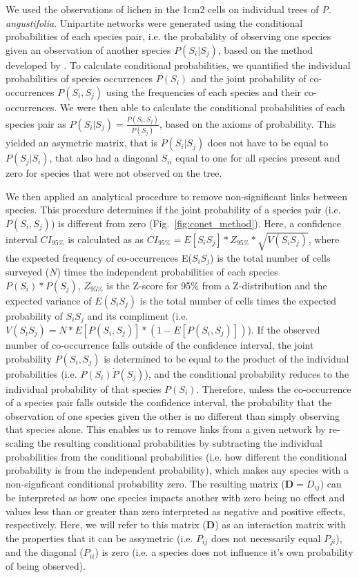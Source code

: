 \documentclass[9pt,twocolumn,twoside,lineno]{pnas-new}
\begin{document}
{We used the observations of lichen in the 1cm2 cells on individual
trees of \textit{P. angustifolia}. Unipartite networks were generated
using the conditional probabilities of each species pair, i.e. the
probability of observing one species given an observation of another
species $P(S_i | S_j)$, based on the method developed by
\citep{Araujo2011}. To calculate conditional probabilities, we
quantified the individual probabilities of species occurrences
$P(S_i)$ and the joint probability of co-occurrences $P(S_i,S_j)$
using the frequencies of each species and their co-occurrences. We
were then able to calculate the conditional probabilities of each
species pair as $P(S_i|S_j) = \frac{P(S_i,S_j)}{P(S_j)}$, based on the
axioms of probability. This yielded an asymetric matrix, that is
$P(S_i|S_j)$ does not have to be equal to $P(S_j|S_i)$, that also had
a diagonal $S_{ii}$ equal to one for all species present and zero for
species that were not observed on the tree.

We then applied an analytical procedure to remove non-significant
links between species. This procedure determines if the joint
probability of a species pair (i.e. $P(S_i,S_j)$) is different from
zero (Fig.~\ref{fig:conet_method}).  Here, a confidence interval
$CI_{95\%}$ is calculated as as $CI_{95\%} = E[S_iS_j] * Z_{95\%} *
\sqrt{V(S_iS_j)}$, where the expected frequency of co-occurrences
E($S_iS_j$) is the total number of cells surveyed ($N$) times the
independent probabilities of each species $P(S_i) * P(S_j)$,
$Z_{95\%}$ is the Z-score for 95\% from a Z-distribution and the
expected variance of $E(S_iS_j)$ is the total number of cells times
the expected probability of $S_iS_j$ and its compliment
(i.e. $V(S_iS_j) = N * E[P(S_i,S_j)] * (1 - E[P(S_i,S_j)])$). If the
observed number of co-occurrence falls outside of the confidence
interval, the joint probability $P(S_i,S_j)$ is determined to be equal
to the product of the individual probabilities (i.e. $P(S_i) \dot
P(S_j)$), and the conditional probability reduces to the individual
probability of that species $P(S_i)$. Therefore, unless the
co-occurrence of a species pair falls outside the confidence interval,
the probability that the observation of one species given the other is
no different than simply observing that species alone. This enables us
to remove links from a given network by re-scaling the resulting
conditional probabilities by subtracting the individual probabilities
from the conditional probabilities (i.e. how different the conditional
probability is from the independent probability), which makes any
species with a non-signficant conditional probability zero. The
resulting matrix ($\mathbf{D} = D_{ij}$) can be interpreted as how one
species impacts another with zero being no effect and values less than
or greater than zero interpreted as negative and positive effects,
respectively. Here, we will refer to this matrix ($\mathbf{D}$) as an
interaction matrix with the properties that it can be assymetric
(i.e. $P_{ij}$ does not necessarily equal $P_{ji}$), and the diagonal
($P_{ii}$) is zero (i.e. a species does not influence it's own
probability of being observed).

}
\end{document}
